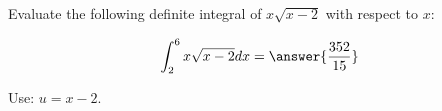 \documentclass{ximera}
\author{Gregory Hartman \and Matthew Carr\and Nela Lakos}
\begin{document}
\begin{exercise}

Evaluate the following definite integral of $x\sqrt{x-2}$ with respect to $x$:

\[
\int_{2}^{6}x\sqrt{x-2} dx=\answer{\frac{352}{15}}
\]

\begin{hint}
Use: $u=x-2$.
\end{hint}
\end{exercise}
\end{document}
